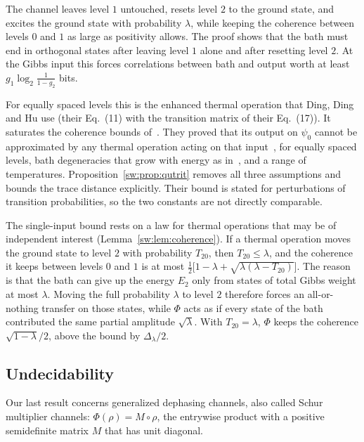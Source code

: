 The channel leaves level $1$ untouched, resets level $2$ to the ground state, and excites the ground state with probability $\lambda$, while keeping the coherence between levels $0$ and $1$ as large as positivity allows. The proof shows that the bath must end in orthogonal states after leaving level $1$ alone and after resetting level $2$. At the Gibbs input this forces correlations between bath and output worth at least $g_1\log_2\frac1{1-g_2}$ bits.

For equally spaced levels this is the enhanced thermal operation that Ding, Ding and Hu use (their Eq.~(11) with the transition matrix of their Eq.~(17)). It saturates the coherence bounds of~\cite{Cwiklinski15,Lostaglio15}. They proved that its output on $\psi_0$ cannot be approximated by any thermal operation acting on that input~\cite{DingFengHu21}, for equally spaced levels, bath degeneracies that grow with energy as in~\cite{HorodeckiOppenheim13}, and a range of temperatures. Proposition~\ref{sw:prop:qutrit} removes all three assumptions and bounds the trace distance explicitly. Their bound is stated for perturbations of transition probabilities, so the two constants are not directly comparable.

The single-input bound rests on a law for thermal operations that may be of independent interest (Lemma~\ref{sw:lem:coherence}). If a thermal operation moves the ground state to level $2$ with probability $T_{20}$, then $T_{20}\le\lambda$, and the coherence it keeps between levels $0$ and $1$ is at most $\frac12\bigl[1-\lambda+\sqrt{\lambda(\lambda-T_{20})}\bigr]$. The reason is that the bath can give up the energy $E_2$ only from states of total Gibbs weight at most $\lambda$. Moving the full probability $\lambda$ to level $2$ therefore forces an all-or-nothing transfer on those states, while $\Phi$ acts as if every state of the bath contributed the same partial amplitude $\sqrt\lambda$. With $T_{20}=\lambda$, $\Phi$ keeps the coherence $\sqrt{1-\lambda}/2$, above the bound by $\Delta_\lambda/2$.

\subsection{Undecidability}\label{sw:sec:undecidable}

Our last result concerns generalized dephasing channels, also called Schur multiplier channels: $\Phi(\rho)=M\circ\rho$, the entrywise product with a positive semidefinite matrix $M$ that has unit diagonal.

